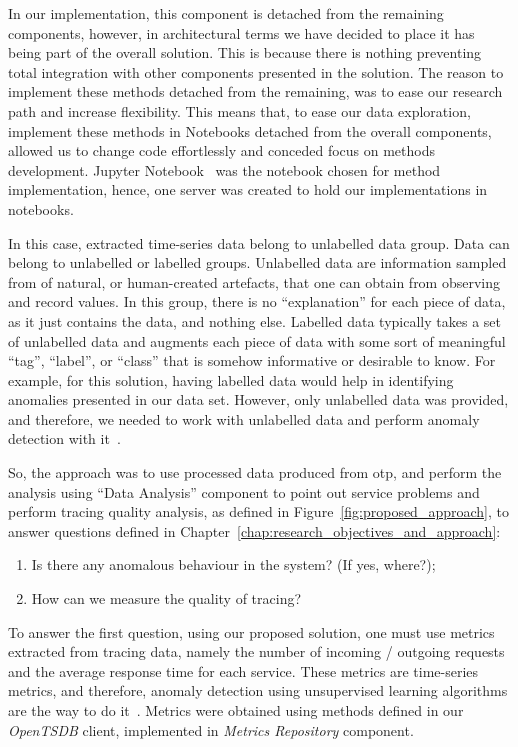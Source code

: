 In our implementation, this component is detached from the remaining components, however, in architectural terms we have decided to place it has being part of the overall solution. This is because there is nothing preventing total integration with other components presented in the solution. The reason to implement these methods detached from the remaining, was to ease our research path and increase flexibility. This means that, to ease our data exploration, implement these methods in Notebooks detached from the overall components, allowed us to change code effortlessly and conceded focus on methods development. Jupyter Notebook~\cite{jupyter_notebooks} was the notebook chosen for method implementation, hence, one server was created to hold our implementations in notebooks.

In this case, extracted time-series data belong to unlabelled data group. Data can belong to unlabelled or labelled groups. Unlabelled data are information sampled from of natural, or human-created artefacts, that one can obtain from observing and record values. In this group, there is no ``explanation'' for each piece of data, as it just contains the data, and nothing else. Labelled data typically takes a set of unlabelled data and augments each piece of data with some sort of meaningful ``tag'', ``label'', or ``class'' that is somehow informative or desirable to know. For example, for this solution, having labelled data would help in identifying anomalies presented in our data set. However, only unlabelled data was provided, and therefore, we needed to work with unlabelled data and perform anomaly detection with it~\cite{Kothari}.

So, the approach was to use processed data produced from \gls{otp}, and perform the analysis using ``Data Analysis'' component to point out service problems and perform tracing quality analysis, as defined in Figure~\ref{fig:proposed_approach}, to answer questions defined in Chapter~\ref{chap:research_objectives_and_approach}:

\begin{enumerate}
    \item Is there any anomalous behaviour in the system? (If yes, where?);
    \item How can we measure the quality of tracing?
\end{enumerate}

To answer the first question, using our proposed solution, one must use metrics extracted from tracing data, namely the number of incoming / outgoing requests and the average response time for each service. These metrics are time-series metrics, and therefore, anomaly detection using unsupervised learning algorithms are the way to do it~\cite{Brillinger2006}. Metrics were obtained using methods defined in our \emph{OpenTSDB} client, implemented in \emph{Metrics Repository} component.

